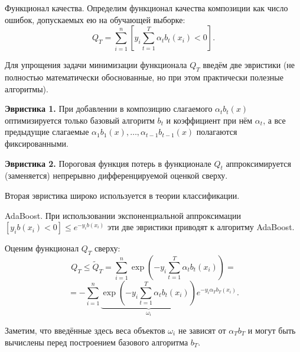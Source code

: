 \documentclass[10pt,unicode,notheorems]{beamer}
\begin{document}
\begin{frame}{Функционал качества.}
Определим функционал качества композиции как число ошибок, допускаемых ею на обучающей выборке:
\begin{equation}\label{eq_4}
    Q_T =\sum_{i=1}^{n}\left[y_i \sum_{t=1}^{T} \alpha_t b_t(x_i) < 0\right].
\end{equation}

Для упрощения задачи минимизации функционала $Q_T$ введём две эвристики (не полностью математически обоснованные, но при этом практически полезные алгоритмы).
\vspace{0.2cm}

\textbf{Эвристика 1.} При добавлении в композицию слагаемого $\alpha_t b_t(x)$ оптимизируется только базовый алгоритм $b_t$ и коэффициент при нём $\alpha_t$, а все предыдущие слагаемые $\alpha_1 b_1(x), \ldots, \alpha_{t-1} b_{t-1}(x)$ полагаются фиксированными.
\vspace{0.2cm}

\textbf{Эвристика 2.} Пороговая функция потерь в функционале $Q_t$ аппроксимируется (заменяется) непрерывно дифференцируемой оценкой сверху.
\vspace{0.2cm}

Вторая эвристика широко используется в теории классификации. 


\end{frame}


\begin{frame}{AdaBoost.}
При использовании экспоненциальной аппроксимации $[y_i b(x_i) < 0] \leq e^{−y_i b(x_i)}$ эти две эвристики приводят к алгоритму AdaBoost.
\vspace{0.2cm}

Оценим функционал $Q_T$ сверху:
\begin{equation*}
    Q_T \leq \widetilde {Q}_T =\sum_{i=1}^{n} \exp \left(-y_i \sum_{t=1}^{T} \alpha_t b_t(x_i) \right) =
\end{equation*}
\begin{equation*}
    = -\sum_{i=1}^{n}  \underbrace{\exp \left(-y_i \sum_{t=1}^{T} \alpha_t b_t(x_i) \right)}_{\omega_i} e^{−y_i\alpha_T b_T(x_i)}.
\end{equation*}

Заметим, что введённые здесь веса объектов $\omega_i$ не зависят от $\alpha_T b_T$ и могут быть вычислены перед построением базового алгоритма $b_T$.
\end{frame}
\end{document}

